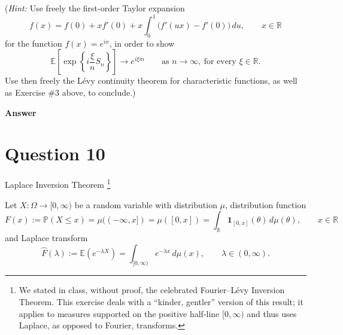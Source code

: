 \documentclass[letterpaper]{article}
\begin{document}
		(\emph{Hint:} Use freely the first-order Taylor expansion
		\[
		f(x)=f(0)+x f'(0)+x\int_0^1\bigl(f'(ux)-f'(0)\bigr)\,du, \qquad x\in\mathbb{R}
		\]
		for the function $f(x)=e^{ix}$, in order to show
		\[
		\mathbb{E}\left[\exp\left\{i\frac{\xi}{n}S_n\right\}\right]\longrightarrow e^{i\xi m}
		\qquad \text{as } n\to\infty,\ \text{for every } \xi\in\mathbb{R}.
		\]
		Use then freely the L\'evy continuity theorem for characteristic functions, as well as Exercise \#3 above, to conclude.)
		
		
		\textbf{Answer}
		
		\clearpage
		
		\section{Question 10}
		{\color{deepred} 
		 Laplace Inversion Theorem \footnote{We stated in class, without proof, the celebrated Fourier--L\'evy Inversion Theorem. This exercise deals with a ``kinder, gentler'' version of this result; it applies to measures supported on the positive half-line $[0,\infty)$ and thus uses Laplace, as opposed to Fourier, transforms.}}
		 
		 
		 Let $X:\Omega\to[0,\infty)$ be a random variable with distribution $\mu$, distribution function
		\[
		F(x):=\mathbb{P}(X\le x)=\mu((-\infty,x])=\mu([0,x])=\int_{\mathbb{R}}\mathbf{1}_{[0,x]}(\theta)\,d\mu(\theta), \qquad x\in\mathbb{R}
		\]
		and Laplace transform
		\[
		\widehat{F}(\lambda):=\mathbb{E}(e^{-\lambda X})=\int_{[0,\infty)} e^{-\lambda x}\,d\mu(x), \qquad \lambda\in(0,\infty).
		\]
		
\end{document}
